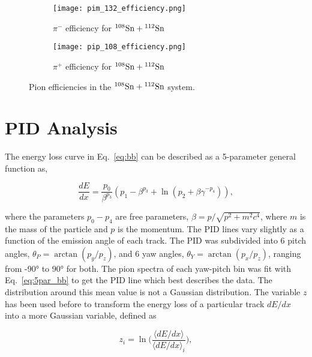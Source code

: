 \begin{figure}[!htb]
    \centering
    \begin{subfigure}[t]{0.49\textwidth}
        \centering
        \texttt{[image: pim\_132\_efficiency.png]}
        \caption{$\pi^-$ efficiency for ${}^{108}\mathrm{Sn} + {}^{112}\mathrm{Sn}$} \label{fig:pim_108_eff}
    \end{subfigure}
    \hfill
    \begin{subfigure}[t]{.49\textwidth}
        \centering
        \texttt{[image: pip\_108\_efficiency.png]} 
        \caption{$\pi^+$ efficiency for ${}^{108}\mathrm{Sn} + {}^{112}\mathrm{Sn}$} \label{fig:pip_108_eff}
    \end{subfigure}
  
    \caption{ Pion efficiencies in the ${}^{108}\mathrm{Sn} + {}^{112}\mathrm{Sn}$ system. }
\label{fig:108_eff}
\end{figure}


\section{PID Analysis}
\label{sec:pid}



The energy loss curve in Eq.~\ref{eq:bb} can be described as a 5-parameter general function as, 

\begin{equation}
\frac{dE}{dx} = \frac{p_0}{\beta^{p_3}}(p_1 - \beta^{p_3} + \ln(p_2 + {\beta\gamma}^{-p_4})),
\label{eq:5par_bb}
\end{equation}

where the parameters $p_0-p_4$ are free parameters, $\beta= p/\sqrt{p^2 + m^2c^4}$, where $m$ is the mass of the particle and $p$ is the momentum. The PID lines vary slightly as a function of the emission angle of each track. The PID was subdivided into 6 pitch angles, $\theta_P = \arctan(p_y/p_z)$, and 6 yaw angles, $\theta_Y = \arctan(p_x/p_z)$, ranging from \ang{-90} to \ang{90} for both. The pion spectra of each yaw-pitch bin was fit with Eq.~\ref{eq:5par_bb} to get the PID line which best describes the data. The distribution around this mean value is not a Gaussian distribution. The variable $z$ has been used before to transform the energy loss of a particular track $dE/dx$ into a more Gaussian variable, defined as

\begin{equation}
z_i = \ln\Big(\frac{\langle dE/dx\rangle}{\langle dE/dx\rangle_i}\Big),
\end{equation}

